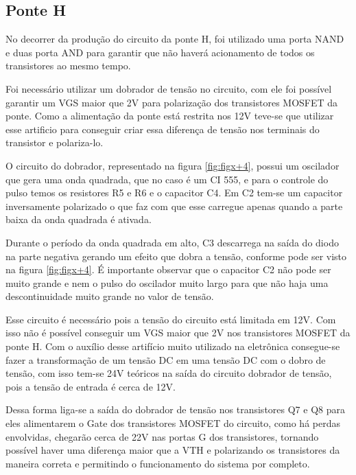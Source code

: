 \subsection{Ponte H}

No decorrer da produção do circuito da ponte H, foi utilizado uma porta NAND e duas porta AND para garantir que não haverá acionamento de todos os transistores ao mesmo tempo.

Foi necessário utilizar um dobrador de tensão no circuito, com ele foi possível garantir um VGS maior que 2V para polarização dos transistores MOSFET da ponte. Como a alimentação da ponte está restrita nos 12V teve-se que utilizar esse artificio para conseguir criar essa diferença de tensão nos terminais do transistor e polariza-lo.

O circuito do dobrador, representado na figura \ref{fig:figx+4}, possui um oscilador que gera uma onda quadrada, que no caso é um CI 555, e para o controle do pulso temos os resistores R5 e R6 e o capacitor C4. Em C2 tem-se um capacitor inversamente polarizado o que faz com que esse carregue apenas quando a parte baixa da onda quadrada é ativada.

Durante o período da onda quadrada em alto, C3 descarrega na saída do diodo na parte negativa gerando um efeito que dobra a tensão, conforme pode ser visto na figura \ref{fig:figx+4}. É importante observar que o capacitor C2 não pode ser muito grande e nem o pulso do oscilador muito largo para que não haja uma descontinuidade muito grande no valor de tensão.

Esse circuito é necessário pois a tensão do circuito está limitada em 12V. Com isso não é possível conseguir um VGS maior que 2V nos transistores MOSFET da ponte H. Com o auxílio desse artifício muito utilizado na eletrônica consegue-se fazer a transformação de um tensão DC em uma tensão DC com o dobro de tensão, com isso tem-se 24V teóricos na saída do circuito dobrador de tensão, pois a tensão de entrada é cerca de 12V.

Dessa forma liga-se a saída do dobrador de tensão nos transistores Q7 e Q8 para eles alimentarem o Gate dos transistores MOSFET do circuito, como há perdas envolvidas, chegarão cerca de 22V nas portas G dos transistores, tornando possível haver uma diferença maior que a VTH e polarizando os transistores da maneira correta e permitindo o funcionamento do sistema por completo.

